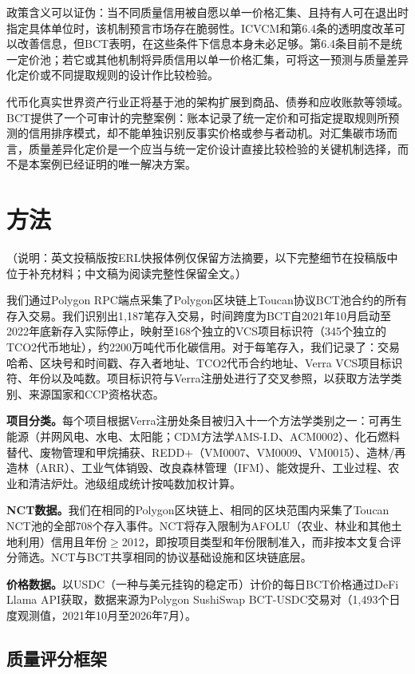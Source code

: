\documentclass[12pt,a4paper]{article}
\begin{document}
政策含义可以证伪：当不同质量信用被自愿以单一价格汇集、且持有人可在退出时指定具体单位时，该机制预言市场存在脆弱性。ICVCM和第6.4条的透明度改革可以改善信息，但BCT表明，在这些条件下信息本身未必足够。第6.4条目前不是统一定价池；若它或其他机制将异质信用以单一价格汇集，可将这一预测与质量差异化定价或不同提取规则的设计作比较检验。

代币化真实世界资产行业正将基于池的架构扩展到商品、债券和应收账款等领域。BCT提供了一个可审计的完整案例：账本记录了统一定价和可指定提取规则所预测的信用排序模式，却不能单独识别反事实价格或参与者动机。对汇集碳市场而言，质量差异化定价是一个应当与统一定价设计直接比较检验的关键机制选择，而不是本案例已经证明的唯一解决方案。

\section*{方法}
（说明：英文投稿版按ERL快报体例仅保留方法摘要，以下完整细节在投稿版中位于补充材料；中文稿为阅读完整性保留全文。）

我们通过Polygon RPC端点采集了Polygon区块链上Toucan协议BCT池合约的所有存入交易。我们识别出1,187笔存入交易，时间跨度为BCT自2021年10月启动至2022年底新存入实际停止，映射至168个独立的VCS项目标识符（345个独立的TCO2代币地址），约2200万吨代币化碳信用。对于每笔存入，我们记录了：交易哈希、区块号和时间戳、存入者地址、TCO2代币合约地址、Verra VCS项目标识符、年份以及吨数。项目标识符与Verra注册处进行了交叉参照，以获取方法学类别、来源国家和CCP资格状态。

\textbf{项目分类。}每个项目根据Verra注册处条目被归入十一个方法学类别之一：可再生能源（并网风电、水电、太阳能；CDM方法学AMS-I.D、ACM0002）、化石燃料替代、废物管理和甲烷捕获、REDD+（VM0007、VM0009、VM0015）、造林/再造林（ARR）、工业气体销毁、改良森林管理（IFM）、能效提升、工业过程、农业和清洁炉灶。池级组成统计按吨数加权计算。

\textbf{NCT数据。}我们在相同的Polygon区块链上、相同的区块范围内采集了Toucan NCT池的全部708个存入事件。NCT将存入限制为AFOLU（农业、林业和其他土地利用）信用且年份$\geq$2012，即按项目类型和年份限制准入，而非按本文复合评分筛选。NCT与BCT共享相同的协议基础设施和区块链底层。

\textbf{价格数据。}以USDC（一种与美元挂钩的稳定币）计价的每日BCT价格通过DeFi Llama API获取，数据来源为Polygon SushiSwap BCT-USDC交易对（1,493个日度观测值，2021年10月至2026年7月）。

\subsection*{质量评分框架}
\end{document}
